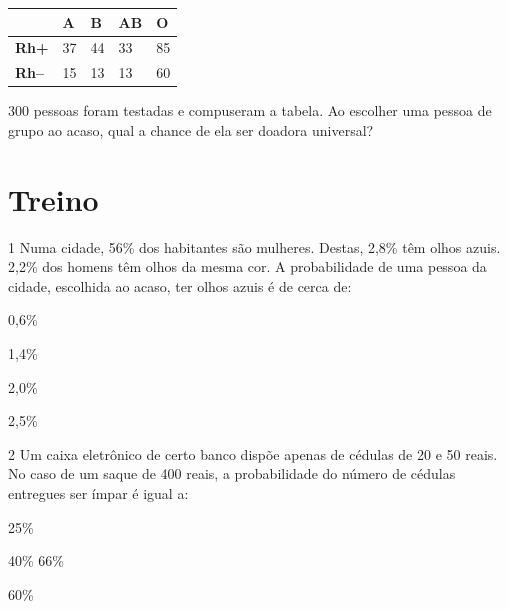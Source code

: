 \begin{longtable}[]{@{}lllll@{}}
\toprule
& \textbf{A} & \textbf{B} & \textbf{AB} & \textbf{O}\tabularnewline
\midrule
\endhead
\textbf{Rh+} & 37 & 44 & 33 & 85\tabularnewline
\textbf{Rh--} & 15 & 13 & 13 & 60\tabularnewline
\bottomrule
\end{longtable}

300 pessoas foram testadas e compuseram a tabela. Ao escolher uma pessoa
de grupo ao acaso, qual a chance de ela ser doadora universal?

\begin{emptybox}
\end{emptybox}

\pagebreak
\section*{Treino}

\num{1} Numa cidade, 56\% dos habitantes são mulheres. Destas, 2,8\% têm olhos
azuis. 2,2\% dos homens têm olhos da mesma cor. A probabilidade de uma pessoa 
da cidade, escolhida ao acaso, ter olhos azuis é de cerca de:

\begin{escolha}

  \item 0,6\%

  \item 1,4\%

  \item 2,0\%

  \item 2,5\%

\end{escolha}


\num{2} Um caixa eletrônico de certo banco dispõe apenas de cédulas de 20 e 50
reais. No caso de um saque de 400 reais, a probabilidade do número de
cédulas entregues ser ímpar é igual a:

\begin{escolha}

  \item 25\%

  \item 40\%
66\%

  \item 60\%

\end{escolha}


